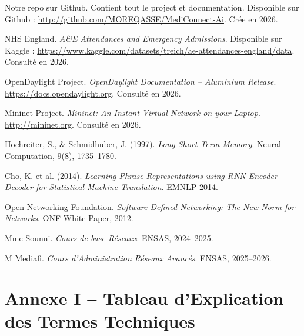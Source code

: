 \documentclass[12pt,a4paper]{article}
\begin{document}
\begin{enumerate}[leftmargin=1.5cm, label={[\arabic*]}]
  \item Notre repo sur Github. Contient tout le project et documentation. Disponible sur Github : \url{http://github.com/MOREQASSE/MediConnect-Ai}. Crée en 2026.

  \item NHS England. \textit{A\&E Attendances and Emergency Admissions}. Disponible sur Kaggle : \url{https://www.kaggle.com/datasets/treich/ae-attendances-england/data}. Consulté en 2026.

  \item OpenDaylight Project. \textit{OpenDaylight Documentation -- Aluminium Release}. \url{https://docs.opendaylight.org}. Consulté en 2026.

  \item Mininet Project. \textit{Mininet: An Instant Virtual Network on your Laptop}. \url{http://mininet.org}. Consulté en 2026.

  \item Hochreiter, S., \& Schmidhuber, J. (1997). \textit{Long Short-Term Memory}. Neural Computation, 9(8), 1735–1780.

  \item Cho, K. et al. (2014). \textit{Learning Phrase Representations using RNN Encoder-Decoder for Statistical Machine Translation}. EMNLP 2014.

  \item Open Networking Foundation. \textit{Software-Defined Networking: The New Norm for Networks}. ONF White Paper, 2012.

  \item Mme Sounni. \textit{Cours de base Réseaux}. ENSAS, 2024--2025.
  \item M Mediafi. \textit{Cours d'Administration Réseaux Avancés}. ENSAS, 2025--2026.
\end{enumerate}

\newpage
\appendix
\section{Annexe I -- Tableau d'Explication des Termes Techniques}
\end{document}
